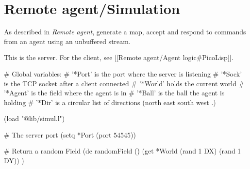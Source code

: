 \pagebreak{}
\section*{Remote agent/Simulation}

As described in \emph{Remote agent}, generate a map, accept and
respond to commands from an agent using an unbuffered stream.

\begin{wideverbatim}

This is the server. For the client, see [[Remote agent/Agent logic#PicoLisp]].

# Global variables:
#  '*Port' is the port where the server is listening
#  '*Sock' is the TCP socket after a client connected
#  '*World' holds the current world
#  '*Agent' is the field where the agent is in
#  '*Ball' is the ball the agent is holding
#  '*Dir' is a circular list of directions (north east south west .)

(load "@lib/simul.l")

# The server port
(setq *Port (port 54545))

# Return a random Field
(de randomField ()
   (get *World (rand 1 DX) (rand 1 DY)) )

\end{wideverbatim}

